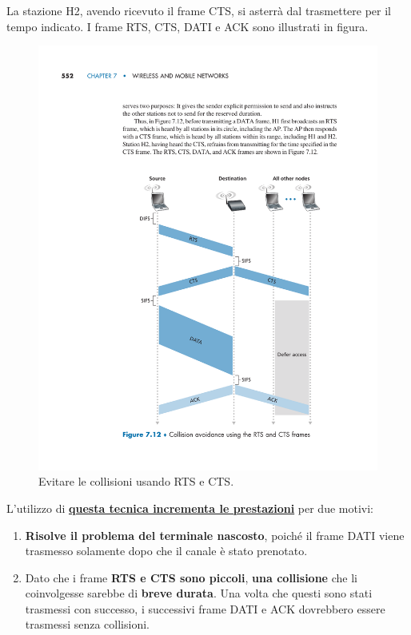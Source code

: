 \documentclass[a4paper]{article}
\begin{document}
	\noindent
	La stazione H2, avendo ricevuto il frame CTS, si asterrà dal trasmettere per il tempo indicato. I frame RTS, CTS, DATI e ACK sono illustrati in figura.\newline
	\begin{figure}[!htp]
		\centering
		\includegraphics[width=.9\textwidth]{img/RTS_e_CTS.pdf}
		\caption{Evitare le collisioni usando RTS e CTS.}
		\label{evitare collisioni RTS/CTS}
	\end{figure}

	\noindent
	L’utilizzo di \underline{\textbf{questa tecnica incrementa le prestazioni}} per due motivi:
	\begin{enumerate}
		\item \textbf{Risolve il problema del terminale nascosto}, poiché il frame DATI viene trasmesso solamente dopo che il canale è stato prenotato.
		
		\item Dato che i frame \textbf{RTS e CTS sono piccoli}, \textbf{una collisione} che li coinvolgesse sarebbe di \textbf{breve durata}. Una volta che questi sono stati trasmessi con successo, i successivi frame DATI e ACK dovrebbero essere trasmessi senza collisioni.
	\end{enumerate}\newpage
\end{document}
